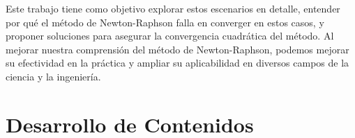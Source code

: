 \documentclass[conference]{IEEEtran}
\begin{document}
Este trabajo tiene como objetivo explorar estos escenarios en detalle,
entender por qué el método de Newton-Raphson falla en converger en estos
casos, y proponer soluciones para asegurar la convergencia cuadrática del
método. Al mejorar nuestra comprensión del método de Newton-Raphson, podemos
mejorar su efectividad en la práctica y ampliar su aplicabilidad en diversos
campos de la ciencia y la ingeniería.

\nocite{bolivar2005metodo}

\section{Desarrollo de Contenidos}


\end{document}

